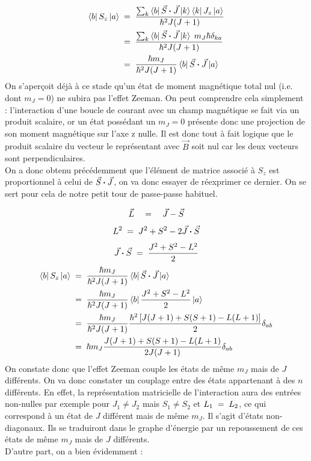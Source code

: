 \begin{align*}
    \bra{b}S_z\ket{a}
    &\; = \;
    \dfrac{\sum_k \bra{b}\vec{S}\boldsymbol{\cdot}\vec{J}\ket{k}\bra{k}J_z\ket{a}}{\hbar^2 J(J+1)}\\
     &\; = \;
    \dfrac{\sum_k \bra{b}\vec{S}\boldsymbol{\cdot}\vec{J} \ket{k} \; m_J\hbar \delta_{ka}}{\hbar^2 J(J+1)}\\
    &\; = \;
    \dfrac{\hbar m_J}{\hbar^2 J(J+1)} \bra{b}\vec{S}\boldsymbol{\cdot}\vec{J}\ket{a}
\end{align*}
On s'aperçoit déjà à ce stade qu'un état de moment magnétique total nul (i.e. dont $m_J = 0$) ne subira pas l'effet Zeeman. On peut comprendre cela simplement : l'interaction d'une boucle de courant avec un champ magnétique se fait via un produit scalaire, or un état possédant un  $m_J = 0$ présente donc une projection de son moment magnétique sur l'axe z nulle. Il est donc tout à fait logique que le produit scalaire du vecteur le représentant avec $\vec{B}$ soit nul car les deux vecteurs sont perpendiculaires.\\
On a donc obtenu précédemment que l'élément de matrice associé à $S_z$ est proportionnel à celui de $\vec{S}\boldsymbol{\cdot}\vec{J}$, on va donc essayer de réexprimer ce dernier. On se sert pour cela de notre petit tour de passe-passe habituel.

\[
    \vec{L} \quad = \quad \vec{J} - \vec{S}
\]
\[
    L^2 \; = \; J^2 + S^2 - 2\vec{J}\boldsymbol{\cdot} \vec{S}
\]
\[
    \vec{J}\boldsymbol{\cdot} \vec{S} \; = \; \dfrac{J^2 + S^2 - L^2}{2}
\]
\begin{align*}
    \bra{b}S_z\ket{a}
    &\; = \;
    \dfrac{\hbar m_J}{\hbar^2 J(J+1)} \bra{b}\vec{S}\boldsymbol{\cdot}\vec{J}\ket{a}\\
    &\; = \;
    \dfrac{\hbar m_J}{\hbar^2 J(J+1)} \bra{b}  \dfrac{J^2 + S^2 - L^2}{2}  \ket{a}\\
    &\; = \;
    \dfrac{\hbar m_J}{\hbar^2 J(J+1)} \dfrac{\hbar^2 \left[J(J+1) + S(S+1) - L(L+1) \right]}{2}\delta_{ab}\\
    &\; = \;
    \hbar m_J \dfrac{J(J+1) + S(S+1) - L(L+1) }{2J(J+1)} \delta_{ab}
\end{align*}
On constate donc que l'effet Zeeman couple les états de même $m_J$ mais de $J$ différents. On va donc constater un couplage entre des états appartenant à des $n$ différents. En effet, la représentation matricielle de l'interaction aura des entrées non-nulles par exemple pour $J_1\neq J_2$ mais $S_1\neq S_2$ et $L_1 \; = \; L_2$, ce qui correspond à un état de $J$ différent mais de même $m_J$. Il s'agit d'états non-diagonaux. Ils se traduiront dans le graphe d'énergie par un repoussement de ces états de même $m_J$ mais de $J$ différents.\\
D'autre part, on a bien évidemment :

